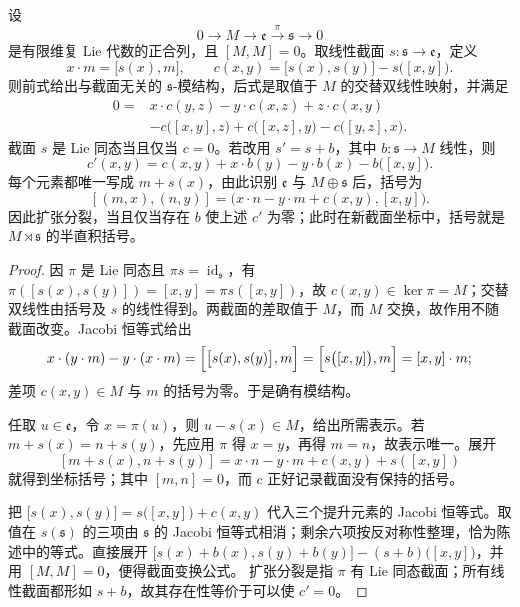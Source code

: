 \begin{proposition}[交换核扩张的障碍]\label{b5:prop:levi-abelian-obstruction}
	设
	\[
		0\longrightarrow M\longrightarrow\mathfrak e \overset{\pi}{\longrightarrow}\mathfrak s\longrightarrow0
	\]
	是有限维复 Lie 代数的正合列，且 \([M,M]=0\)。取线性截面 \(s:\mathfrak s\rightarrow\mathfrak e\)，定义
	\[
		x\cdot m=\bigl[s(x),m\bigr],\qquad c(x,y)=\bigl[s(x),s(y)\bigr]-s\bigl([x,y]\bigr).
	\]
	则前式给出与截面无关的 \(\mathfrak s\)-模结构，后式是取值于 \(M\) 的交替双线性映射，并满足
	\[
		\begin{aligned}
			0={}&x\cdot c(y,z)-y\cdot c(x,z)+z\cdot c(x,y)\\
			&-c\bigl([x,y],z\bigr)+c\bigl([x,z],y\bigr)-c\bigl([y,z],x\bigr).
		\end{aligned}
	\]
	截面 \(s\) 是 Lie 同态当且仅当 \(c=0\)。若改用 \(s'=s+b\)，其中 \(b:\mathfrak s\rightarrow M\) 线性，则
	\[
		c'(x,y)=c(x,y)+x\cdot b(y)-y\cdot b(x)-b\bigl([x,y]\bigr).
	\]
	每个元素都唯一写成 \(m+s(x)\)，由此识别 \(\mathfrak e\) 与 \(M\oplus\mathfrak s\) 后，括号为
	\[
		[(m,x),(n,y)] =\bigl(x\cdot n-y\cdot m+c(x,y),[x,y]\bigr).
	\]
	因此扩张分裂，当且仅当存在 \(b\) 使上述 \(c'\) 为零；此时在新截面坐标中，括号就是 \(M\rtimes\mathfrak s\) 的半直积括号。
\end{proposition}
\begin{proof}
	因 \(\pi\) 是 Lie 同态且 \(\pi s=\operatorname{id}_{\mathfrak s}\)，有 \(\pi([s(x),s(y)])=[x,y]=\pi s([x,y])\)，故 \(c(x,y)\in\ker\pi=M\)；交替双线性由括号及 \(s\) 的线性得到。两截面的差取值于 \(M\)，而 \(M\) 交换，故作用不随截面改变。Jacobi 恒等式给出
	\[
		x\cdot(y\cdot m)-y\cdot(x\cdot m) =\Bigl[\bigl[s(x),s(y)\bigr],m\Bigr]=\Bigl[s\bigl([x,y]\bigr),m\Bigr]=[x,y]\cdot m;
	\]
	差项 \(c(x,y)\in M\) 与 \(m\) 的括号为零。于是确有模结构。

	任取 \(u\in\mathfrak e\)，令 \(x=\pi(u)\)，则 \(u-s(x)\in M\)，给出所需表示。若 \(m+s(x)=n+s(y)\)，先应用 \(\pi\) 得 \(x=y\)，再得 \(m=n\)，故表示唯一。展开
	\[
		[m+s(x),n+s(y)] =x\cdot n-y\cdot m+c(x,y)+s([x,y])
	\]
	就得到坐标括号；其中 \([m,n]=0\)，而 \(c\) 正好记录截面没有保持的括号。

	把 \(\bigl[s(x),s(y)\bigr]=s\bigl([x,y]\bigr)+c(x,y)\) 代入三个提升元素的 Jacobi 恒等式。取值在 \(s(\mathfrak s)\) 的三项由 \(\mathfrak s\) 的 Jacobi 恒等式相消；剩余六项按反对称性整理，恰为陈述中的等式。直接展开 \(\bigl[s(x)+b(x),s(y)+b(y)\bigr]-(s+b)\bigl([x,y]\bigr)\)，并用 \([M,M]=0\)，便得截面变换公式。 扩张分裂是指 \(\pi\) 有 Lie 同态截面；所有线性截面都形如 \(s+b\)，故其存在性等价于可以使 \(c'=0\)。
\end{proof}

